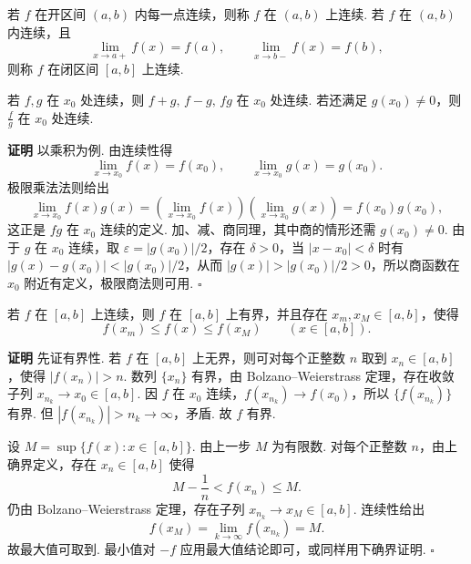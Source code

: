 \documentclass[fontset=fandol]{ctexart}
\newenvironment{proofdetail}{\par\noindent\textbf{证明}\quad}{\hfill$\square$\par\vspace{0.8em}}
\begin{document}
\begin{definition}[区间上的连续]
若 $f$ 在开区间 $(a,b)$ 内每一点连续，则称 $f$ 在 $(a,b)$ 上连续. 若 $f$ 在 $(a,b)$ 内连续，且
\[
\lim_{x\to a+}f(x)=f(a),\qquad \lim_{x\to b-}f(x)=f(b),
\]
则称 $f$ 在闭区间 $[a,b]$ 上连续.
\end{definition}

\begin{proposition}[连续函数的四则运算]
若 $f,g$ 在 $x_0$ 处连续，则 $f+g,\,f-g,\,fg$ 在 $x_0$ 处连续. 若还满足 $g(x_0)\neq0$，则 $\frac{f}{g}$ 在 $x_0$ 处连续.
\end{proposition}
\begin{proofdetail}
以乘积为例. 由连续性得
\[
\lim_{x\to x_0}f(x)=f(x_0),\qquad \lim_{x\to x_0}g(x)=g(x_0).
\]
极限乘法法则给出
\[
\lim_{x\to x_0}f(x)g(x)=\left(\lim_{x\to x_0}f(x)\right)\left(\lim_{x\to x_0}g(x)\right)=f(x_0)g(x_0),
\]
这正是 $fg$ 在 $x_0$ 连续的定义. 加、减、商同理，其中商的情形还需 $g(x_0)\neq0$. 由于 $g$ 在 $x_0$ 连续，取 $\varepsilon=|g(x_0)|/2$，存在 $\delta>0$，当 $|x-x_0|<\delta$ 时有 $|g(x)-g(x_0)|<|g(x_0)|/2$，从而 $|g(x)|>|g(x_0)|/2>0$，所以商函数在 $x_0$ 附近有定义，极限商法则可用.
\end{proofdetail}

\begin{theorem}[闭区间连续函数的有界性与最值定理]
若 $f$ 在 $[a,b]$ 上连续，则 $f$ 在 $[a,b]$ 上有界，并且存在 $x_m,x_M\in[a,b]$，使得
\[
f(x_m)\leq f(x)\leq f(x_M)\qquad (x\in[a,b]).
\]
\end{theorem}
\begin{proofdetail}
先证有界性. 若 $f$ 在 $[a,b]$ 上无界，则可对每个正整数 $n$ 取到 $x_n\in[a,b]$，使得 $|f(x_n)|>n$. 数列 $\{x_n\}$ 有界，由 Bolzano--Weierstrass 定理，存在收敛子列 $x_{n_k}\to x_0\in[a,b]$. 因 $f$ 在 $x_0$ 连续，$f(x_{n_k})\to f(x_0)$，所以 $\{f(x_{n_k})\}$ 有界. 但 $|f(x_{n_k})|>n_k\to\infty$，矛盾. 故 $f$ 有界.

设 $M=\sup\{f(x):x\in[a,b]\}$. 由上一步 $M$ 为有限数. 对每个正整数 $n$，由上确界定义，存在 $x_n\in[a,b]$ 使得
\[
M-\frac1n<f(x_n)\leq M.
\]
仍由 Bolzano--Weierstrass 定理，存在子列 $x_{n_k}\to x_M\in[a,b]$. 连续性给出
\[
f(x_M)=\lim_{k\to\infty}f(x_{n_k})=M.
\]
故最大值可取到. 最小值对 $-f$ 应用最大值结论即可，或同样用下确界证明.
\end{proofdetail}
\end{document}
